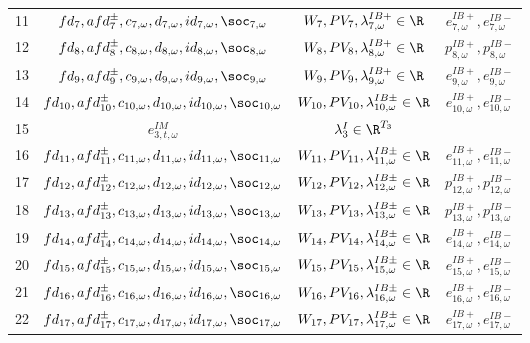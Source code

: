 \begin{table}[H]
\begin{tabular}{c c c c}
	11& $fd_7, afd^{\pm}_7, c_{7, \omega}, d_{7, \omega}, id_{7, \omega}, \soc_{7, \omega}$ & $W_7, PV_7, \lambda^{IB+}_{7, \omega} \in \R$ & $e^{IB+}_{7, \omega}, e^{IB-}_{7, \omega}$\\
	12& $fd_8, afd^{\pm}_8, c_{8, \omega}, d_{8, \omega}, id_{8, \omega}, \soc_{8, \omega}$ & $W_8, PV_8, \lambda^{IB+}_{8, \omega} \in \R$ & $p^{IB+}_{8, \omega}, p^{IB-}_{8, \omega}$ \\
	13& $fd_9, afd^{\pm}_9, c_{9, \omega}, d_{9, \omega}, id_{9, \omega}, \soc_{9, \omega}$ & $W_9, PV_9, \lambda^{IB+}_{9, \omega} \in \R$ & $e^{IB+}_{9, \omega}, e^{IB-}_{9, \omega}$\\
	14& $fd_{10}, afd^{\pm}_{10}, c_{10, \omega}, d_{10, \omega}, id_{10, \omega}, \soc_{10, \omega}$ & $W_{10}, PV_{10}, \lambda^{IB\pm}_{10, \omega} \in \R$ & $e^{IB+}_{10, \omega}, e^{IB-}_{10, \omega}$\\
 15& $e^{IM}_{3, t, \omega}$ & $\lambda^I_3 \in \R^{T_3}$&\\
	16& $fd_{11}, afd^{\pm}_{11}, c_{11, \omega}, d_{11, \omega}, id_{11, \omega}, \soc_{11, \omega}$ & $W_{11}, PV_{11}, \lambda^{IB\pm}_{11, \omega} \in \R$ & $e^{IB+}_{11, \omega}, e^{IB-}_{11, \omega}$\\
	17& $fd_{12}, afd^{\pm}_{12}, c_{12, \omega}, d_{12, \omega}, id_{12, \omega}, \soc_{12, \omega}$ & $W_{12}, PV_{12}, \lambda^{IB\pm}_{12, \omega} \in \R$ & $p^{IB+}_{12, \omega}, p^{IB-}_{12, \omega}$ \\
	18& $fd_{13}, afd^{\pm}_{13}, c_{13, \omega}, d_{13, \omega}, id_{13, \omega}, \soc_{13, \omega}$ & $W_{13}, PV_{13}, \lambda^{IB\pm}_{13, \omega} \in \R$ & $p^{IB+}_{13, \omega}, p^{IB-}_{13, \omega}$ \\
	19& $fd_{14}, afd^{\pm}_{14}, c_{14, \omega}, d_{14, \omega}, id_{14, \omega}, \soc_{14, \omega}$ & $W_{14}, PV_{14}, \lambda^{IB\pm}_{14, \omega} \in \R$ & $e^{IB+}_{14, \omega}, e^{IB-}_{14, \omega}$\\
	20& $fd_{15}, afd^{\pm}_{15}, c_{15, \omega}, d_{15, \omega}, id_{15, \omega}, \soc_{15, \omega}$ & $W_{15}, PV_{15}, \lambda^{IB\pm}_{15, \omega} \in \R$ & $e^{IB+}_{15, \omega}, e^{IB-}_{15, \omega}$\\
	21& $fd_{16}, afd^{\pm}_{16}, c_{16, \omega}, d_{16, \omega}, id_{16, \omega}, \soc_{16, \omega}$ & $W_{16}, PV_{16}, \lambda^{IB\pm}_{16, \omega} \in \R$ & $e^{IB+}_{16, \omega}, e^{IB-}_{16, \omega}$\\
	22& $fd_{17}, afd^{\pm}_{17}, c_{17, \omega}, d_{17, \omega}, id_{17, \omega}, \soc_{17, \omega}$ & $W_{17}, PV_{17}, \lambda^{IB\pm}_{17, \omega} \in \R$ & $e^{IB+}_{17, \omega}, e^{IB-}_{17, \omega}$\\

\end{tabular}
\end{table}
